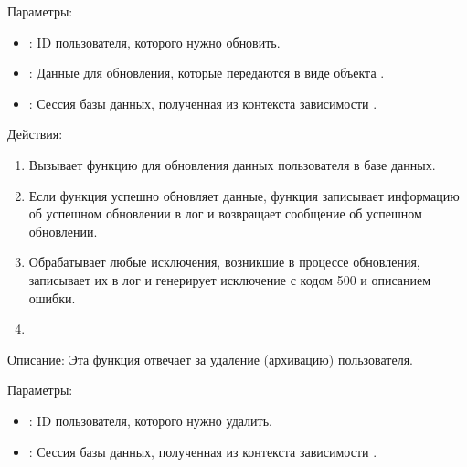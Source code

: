\documentclass[letterpaper,10pt,russian]{sphinxmanual}
\begin{document}
\sphinxAtStartPar
Параметры:
\begin{itemize}
\item {} 
\sphinxAtStartPar
{}: ID пользователя, которого нужно обновить.

\item {} 
\sphinxAtStartPar
{}: Данные для обновления, которые передаются в виде объекта .

\item {} 
\sphinxAtStartPar
{}: Сессия базы данных, полученная из контекста зависимости .

\end{itemize}

\sphinxAtStartPar
Действия:
\begin{enumerate}
%
\item {} 
\sphinxAtStartPar
Вызывает функцию  для обновления данных пользователя в базе данных.

\item {} 
\sphinxAtStartPar
Если функция  успешно обновляет данные, функция записывает информацию об успешном обновлении в лог и возвращает сообщение об успешном обновлении.

\item {} 
\sphinxAtStartPar
Обрабатывает любые исключения, возникшие в процессе обновления, записывает их в лог и генерирует исключение  с кодом 500 и описанием ошибки.

\item {} 
\sphinxAtStartPar
{}

\end{enumerate}

\sphinxAtStartPar
Описание: Эта функция отвечает за удаление (архивацию) пользователя.

\sphinxAtStartPar
Параметры:
\begin{itemize}
\item {} 
\sphinxAtStartPar
{}: ID пользователя, которого нужно удалить.

\item {} 
\sphinxAtStartPar
{}: Сессия базы данных, полученная из контекста зависимости .

\end{itemize}
\end{document}
